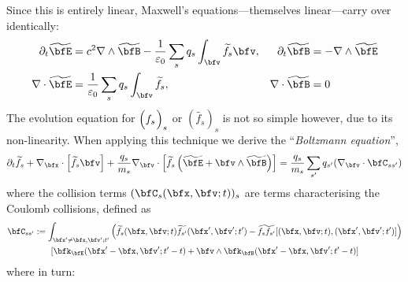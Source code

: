     Since this is entirely linear, Maxwell's equations—themselves linear—carry over identically:
    \begin{align*}
        \partial_{t}\widetilde{\bfE}  &=  c^{2}\nabla\wedge\widetilde{\bfB} - \frac{1}{\varepsilon_{0}}\sum_{s}q_{s}\int_{\bfv}\widetilde{f_{s}}\bfv,  &
        \partial_{t}\widetilde{\bfB}  &=  - \nabla\wedge\widetilde{\bfE}  \\
        \nabla\cdot\widetilde{\bfE}  &=  \frac{1}{\varepsilon_{0}}\sum_{s}q_{s}\int_{\bfv}\widetilde{f_{s}},  &
        \nabla\cdot\widetilde{\bfB}  &=  0
    \end{align*}
    The evolution equation for $\left(f_{s}{\color{white} \widetilde{f_{s}}}\!\!\!\!\!\right)_{s}$ or $\left(\widetilde{f_{s}}\right)_{s}$ is not so simple however, due to its non-linearity. When applying this technique we derive the ``\emph{Boltzmann equation}'', \BA{[Ref]}
    \begin{equation}\label{eqn:Boltzmann equation}
        \partial_{t}\widetilde{f_{s}} + \nabla_{\bfx}\cdot\left[\widetilde{f_{s}}\bfv\right] + \frac{q_{s}}{m_{s}}\nabla_{\bfv}\cdot\left[\widetilde{f_{s}}\left(\widetilde{\bfE} + \bfv\wedge\widetilde{\bfB}\right)\right]  =   \frac{q_{s}}{m_{s}}\sum_{s'}q_{s'}(\nabla_{\bfv}\cdot\bfC_{ss'})
    \end{equation}
    where the collision terms $(\bfC_{s}(\bfx, \bfv; t))_{s}$ are terms characterising the Coulomb collisions, defined as
    \begin{multline}\label{eqn:collision operator}
        \bfC_{ss'}  :=  \int_{\bfx' \neq \bfx, \bfv'; t'}\left(\widetilde{f_{s}}(\bfx, \bfv; t)\widetilde{f_{s'}}(\bfx', \bfv'; t') - \widetilde{f_{s}f_{s'}}[(\bfx, \bfv; t), (\bfx', \bfv'; t')]\right)  \\
        [\bfk_{\bfE}(\bfx' - \bfx, \bfv'; t' - t) + \bfv\wedge\bfk_{\bfB}(\bfx' - \bfx, \bfv'; t' - t)]
    \end{multline}
    where in turn:
